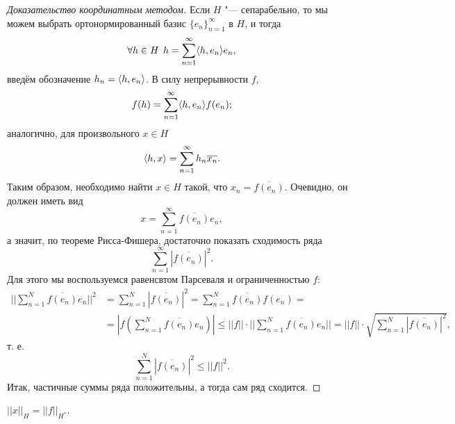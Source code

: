 \documentclass[main]{subfiles}
\begin{document}
\begin{proof}[Доказательство координатным методом]
  Если \( H \) "--- сепарабельно,
  то мы можем выбрать
  ортонормированный базис \( {\{ e_n \}}_{n=1}^\infty \) в \( H \),
  и тогда
  \[
    \forall {h \in H} \; \, h = \sum_{n = 1}^\infty \langle h, e_n \rangle e_n,
  \]
  введём обозначение \( h_n = \langle h, e_n \rangle \).
  В силу непрерывности \( f \),
  \[
    f(h) = \sum_{n=1}^\infty \langle h, e_n \rangle f(e_n);
  \]
  аналогично, для произвольного \( x \in H \)
  \[
    \langle h, x \rangle = \sum_{n=1}^\infty h_n \overline{x_n}.
  \]
  Таким образом, необходимо найти \( x \in H \)
  такой, что \( x_n = \overline{f(e_n)} \).
  Очевидно, он должен иметь вид
  \[
    x = \sum_{n=1}^\infty \overline{f(e_n)} e_n,
  \]
  а значит, по теореме Рисса-Фишера,
  достаточно показать сходимость ряда
  \[
    \sum_{n=1}^\infty \left| \overline{f(e_n)} \right|^2.
  \]
  Для этого мы воспользуемся равенсвтом Парсеваля
  и ограниченностью \( f \):
  \begin{align}
    ||\sum_{n=1}^N \overline{f(e_n)} e_n||^2 &=
    \sum_{n=1}^N \left| \overline{f(e_n)} \right|^2 =
    \sum_{n=1}^N \overline{f(e_n)} f(e_n) = \\
    & = |f(\sum_{n=1}^N \overline{f(e_n)} e_n)| \le
    ||f|| \cdot ||\sum_{n=1}^N \overline{f(e_n)} e_n|| =
    ||f|| \cdot \sqrt{\sum_{n=1}^N \left| \overline{f(e_n)} \right|^2},
  \end{align}
  т. е.
  \[
    \sum_{n=1}^N \left| \overline{f(e_n)} \right|^2 \le ||f||^2.
  \]
  Итак, частичные суммы ряда положительны,
  а тогда сам ряд сходится.
\end{proof}
\begin{corollary}
  \( ||x||_H = ||f||_{H^*} \).
\end{corollary}

\end{document}
